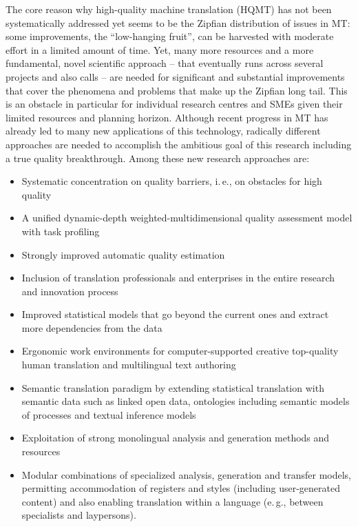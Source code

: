 \documentclass[10pt, plain]{../../metanetpaper}
\begin{document}
\begin{multicols}{2}
The core reason why high-quality machine translation (HQMT) has not been systematically addressed yet seems to be the Zipfian distribution of issues in MT: some improvements, the “low-hanging fruit”, can be harvested with moderate effort in a limited amount of time. Yet, many more resources and a more fundamental, novel scientific approach -- that eventually runs across several projects and also calls -- are needed for significant and substantial improvements that cover the phenomena and problems that make up the Zipfian long tail. This is an obstacle in particular for individual research centres and SMEs given their limited resources and planning horizon. Although recent progress in MT has already led to many new applications of this technology, radically different approaches are needed to accomplish the ambitious goal of this research including a true quality breakthrough. Among these new research approaches are:

\begin{itemize}
\item Systematic concentration on quality barriers, i.\,e., on obstacles for high quality
\item A unified dynamic-depth weighted-multidimensional quality assessment model with task profiling
\item Strongly improved automatic quality estimation
\item Inclusion of translation professionals and enterprises in the entire research and innovation process
\item Improved statistical models that go beyond the current ones and extract more dependencies from the data
\item Ergonomic work environments for computer-supported creative top-quality human translation and multilingual text authoring
\item Semantic translation paradigm by extending statistical translation with semantic data such as linked open data, ontologies including semantic models of processes and textual inference models
\item Exploitation of strong monolingual analysis and generation methods and resources
\item Modular combinations of specialized analysis, generation and transfer models, permitting accommodation of registers and styles (including user-generated content) and also enabling translation within a language (e.\,g., between specialists and laypersons).
\end{itemize}


\end{multicols}
\end{document}
